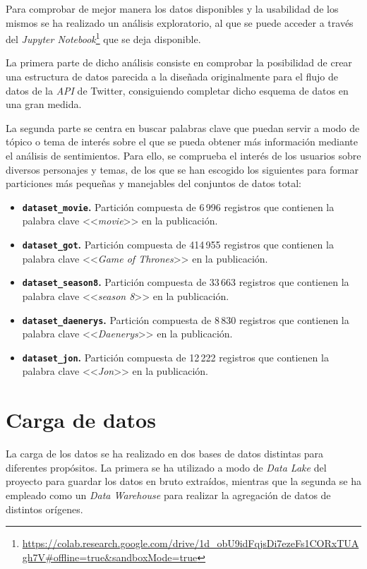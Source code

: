 Para comprobar de mejor manera los datos disponibles y la usabilidad de los mismos se ha realizado un análisis exploratorio, al que se puede acceder a través del \textit{Jupyter Notebook}\footnote{\url{https://colab.research.google.com/drive/1d_obU9idFqjsDi7ezeFs1CORxTUAgh7V\#offline=true&sandboxMode=true}} que se deja disponible.

La primera parte de dicho análisis consiste en comprobar la posibilidad de crear una estructura de datos parecida a la diseñada originalmente para el flujo de datos de la \textit{API} de Twitter, consiguiendo completar dicho esquema de datos en una gran medida.

La segunda parte se centra en buscar palabras clave que puedan servir a modo de tópico o tema de interés sobre el que se pueda obtener más información mediante el análisis de sentimientos. Para ello, se comprueba el interés de los usuarios sobre diversos personajes y temas, de los que se han escogido los siguientes para formar particiones más pequeñas y manejables del conjuntos de datos total:

\begin{itemize}
    \item \textbf{\texttt{dataset\_movie}.} Partición compuesta de 6\,996 registros que contienen la palabra clave <<\textit{movie}>> en la publicación.
    \item \textbf{\texttt{dataset\_got}.} Partición compuesta de 414\,955 registros que contienen la palabra clave <<\textit{Game of Thrones}>> en la publicación.
    \item \textbf{\texttt{dataset\_season8}.} Partición compuesta de 33\,663 registros que contienen la palabra clave <<\textit{season 8}>> en la publicación.
    \item \textbf{\texttt{dataset\_daenerys}.} Partición compuesta de 8\,830 registros que contienen la palabra clave <<\textit{Daenerys}>> en la publicación.
    \item \textbf{\texttt{dataset\_jon}.} Partición compuesta de 12\,222 registros que contienen la palabra clave <<\textit{Jon}>> en la publicación.
\end{itemize}

\section{Carga de datos}

La carga de los datos se ha realizado en dos bases de datos distintas para diferentes propósitos. La primera se ha utilizado a modo de \textit{Data Lake} del proyecto para guardar los datos en bruto extraídos, mientras que la segunda se ha empleado como un \textit{Data Warehouse} para realizar la agregación de datos de distintos orígenes.

